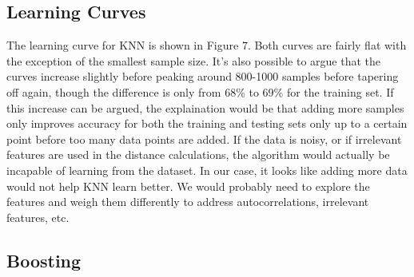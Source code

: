 \documentclass{article}
\begin{document}
\subsection*{Learning Curves}

The learning curve for KNN is shown in Figure 7. Both curves are fairly flat with the exception of the smallest sample size. It's also possible to argue that the curves increase slightly before peaking around 800-1000 samples before tapering off again, though the difference is only from 68\% to 69\% for the training set. If this increase can be argued, the explaination would be that adding more samples only improves accuracy for both the training and testing sets only up to a certain point before too many data points are added. If the data is noisy, or if irrelevant features are used in the distance calculations, the algorithm would actually be incapable of learning from the dataset. In our case, it looks like adding more data would not help KNN learn better. We would probably need to explore the features and weigh them differently to address autocorrelations, irrelevant features, etc. 


\subsection{Boosting}
\end{document}
